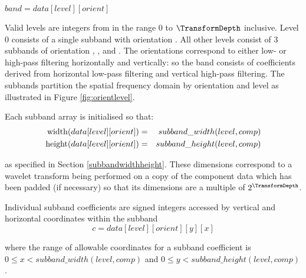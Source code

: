 $band = data[level][orient]$

Valid levels are integers from in the range 0 to $\TransformDepth$ inclusive. 
Level 0 consists of a single subband with orientation \LL. 
All other levels consist of 3 subbands of orientation \LH, \HL, 
and \HH. The orientations correspond to either low- or high-pass filtering
horizontally and vertically: so the \LH band consists of coefficients derived
from horizontal low-pass filtering and vertical high-pass filtering. The subbands
partition the spatial frequency domain by orientation and level as illustrated
in Figure \ref{fig:orientlevel}.

Each subband array is initialised so that:
\begin{eqnarray*}
\operatorname{width}(data[level][orient]) & = & subband\_width(level,comp) \\
\operatorname{height}(data[level][orient]) & = & subband\_height(level,comp)
\end{eqnarray*}

as specified in Section \ref{subbandwidthheight}. These dimensions correspond 
to a wavelet transform being performed on a copy of the component data which 
has been padded (if necessary) so that its
dimensions are a multiple of $2^{\TransformDepth}$.

Individual subband coefficients are signed integers accessed by vertical and 
horizontal coordinates within the subband
\[c = data[level][orient][y][x]\]

where the range of allowable coordinates for a subband coefficient is 
$0\leq x<subband\_width(level,comp)$ and
$0\leq y<subband\_height(level,comp)$.

